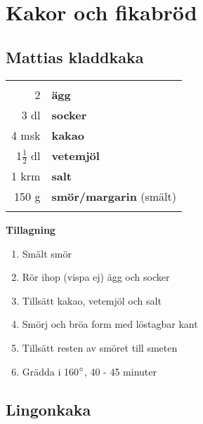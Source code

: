 
\section{Kakor och fikabröd}

\clearpage

\subsection{Mattias kladdkaka}

\begin{table}[H]
	\begin{tabular}{rl}
	\hline
	&\\
		2 & \textbf{ägg}\\
		3 dl & \textbf{socker}\\
		4 msk & \textbf{kakao}\\
		1$\frac{1}{2}$ dl & \textbf{vetemjöl}\\
		1 krm & \textbf{salt}\\
		150 g & \textbf{smör/margarin} (smält)\\
	&\\
	\hline
	\end{tabular}
\end{table}


\begin{multicols*}{2}

\noindent \textbf{Tillagning}
\begin{enumerate}
	\itemsep0cm
	\item Smält smör
	\item Rör ihop (vispa ej) ägg och \mbox{socker}
	\item Tillsätt kakao, vetemjöl och salt
	\item Smörj och bröa form med löstagbar kant
	\item Tillsätt resten av smöret till smeten
	\item Grädda i 160$\degree$, 40 - 45 minuter
\end{enumerate}

\end{multicols*}

\clearpage

\subsection{Lingonkaka}

